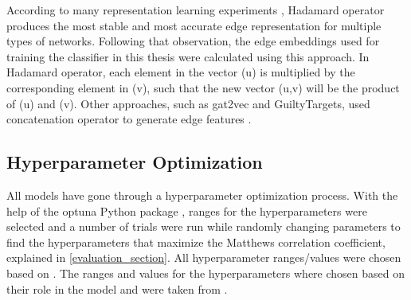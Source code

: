 According to many representation learning experiments \cite{grover_node2vec:_2016, tsitsulin_verse:_2018, yuan_sne:_2017}, Hadamard operator produces the most stable and most accurate edge representation for multiple types of networks. Following that observation, the edge embeddings used for training the classifier in this thesis were calculated using this approach. In Hadamard operator, each element in the vector (u) is multiplied by the corresponding element in (v), such that the new vector (u,v) will be the product of (u) and (v). Other approaches, such as gat2vec and GuiltyTargets, used concatenation operator to generate edge features \cite{muslu_guiltytargets:_2019, sheikh_gat2vec:_2018}.

\subsection{Hyperparameter Optimization}
All models have gone through a hyperparameter optimization process. With the help of the optuna Python package \cite{akiba_optuna:_2019}, ranges for the hyperparameters were selected and a number of trials were run while randomly changing parameters to find the hyperparameters that maximize the Matthews correlation coefficient, explained in \ref{evaluation_section}. All hyperparameter ranges/values were chosen based on \cite{yue_graph_2019}. The ranges and values for the hyperparameters where chosen based on their role in the model and were taken from \cite{yue_graph_2019}.

